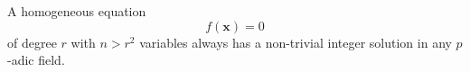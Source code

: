 \begin{proposition}\label{eq:185}
    A homogeneous equation
\[
    f(\mathbf{x})=0
\]
    of degree $r$ with $n>r^2$ variables always has a non-trivial integer solution in any $p$-adic field.
\end{proposition}
